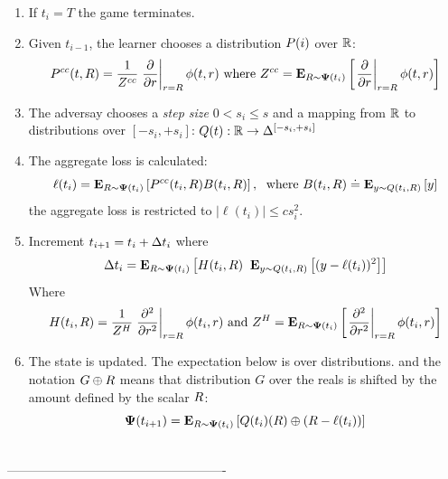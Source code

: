 \documentclass{article}[12pt]
\begin{document}
\begin{enumerate}
\item  If $t_i=T$ the game terminates.
\item Given $t_{i-1}$, the learner chooses a distribution
  $P(i)$ over $\mathbb{R}$:
  \begin{equation} \label{eqn:learner-strat-cc}
  P^{cc}(t,R) =  \frac{1}{Z^{cc}}
  \left. \frac{\partial}{\partial r} \right|_{r=R} \phi(t,r)
  \mbox{ where } Z^{cc} = {\bf E}_{R \sim {\bf \Psi}(t_i)}\left[ \left. \frac{\partial}{\partial r} \right|_{r=R} \phi(t,r) \right]
\end{equation}

\item The adversay chooses a {\em step size} $0<s_i\leq s$ and a mapping from $\mathbb{R}$ to distributions
  over $[-s_i,+s_i]$: $Q(t): \mathbb{R} \to \Delta^{[-s_i,+s_i]}$
\item The aggregate loss is calculated:
  \begin{equation} \label{eqn:ell-discrete}
    \ell(t_i)={\bf E}_{R \sim {\bf \Psi}(t_i)}\left[ P^{cc}(t_i,R)
      B(t_i,R) \right],\;\mbox{ where } B(t_i,R) \doteq {\bf E}_{y \sim Q(t_i,R)}\left[ y \right]
  \end{equation}
  the aggregate loss is restricted to $|\ell(t_i)| \leq c s_i^2$.
\item  Increment $t_{i+1} = t_{i} + \Delta t_i$ where
\begin{equation} \label{eqn:deltat}
  \Delta t_i=
  {\bf E}_{R \sim {\bf \Psi}(t_i)}\left[ H(t_i,R) \;\; {\bf E}_{y \sim Q(t_i,R)}\left[ (y-\ell(t_i))^2 \right] \right]
\end{equation}
Where
\begin{equation}
 H(t_i,R)=\frac{1}{Z^H} \left. \frac{\partial^2}{\partial r^2} \right|_{r=R} \phi(t_i,r)
  \mbox{ and } Z^H = {\bf E}_{R \sim {\bf \Psi}(t_i)}\left[ \left. \frac{\partial^2}{\partial r^2} \right|_{r=R} \phi(t_i,r) \right]
\end{equation}

\item The state is updated. The expectation below is over
  distributions. and the notation $G \oplus R$ means
  that distribution $G$ over the reals is shifted by the amount
  defined by the scalar $R$:
  $${\bf \Psi}(t_{i+1}) = {\bf E}_{R \sim {\bf \Psi}(t_{i})}\left[ Q(t_i)(R)\oplus (R-\ell(t_i)) \right]
  $$
\end{enumerate}

~\\
----------------------------------------------------
~\\
\end{document}
